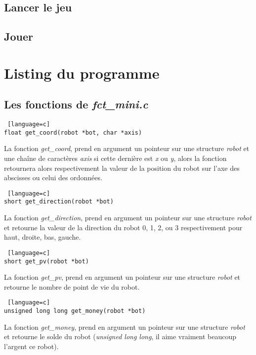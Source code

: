 \documentclass[a4paper, 11pt]{article}
\begin{document}
\subsection{Lancer le jeu}
\subsection{Jouer}

\newpage
\section{Listing du programme}
\subsection{Les fonctions de \emph{fct\_mini.c}}
\begin {lstlisting} [language=c]
float get_coord(robot *bot, char *axis)
\end{lstlisting}
La fonction \emph{get\_coord}, prend en argument un pointeur sur une structure \emph{robot} et une chaîne de caractères \emph{axis} si cette dernière est \emph{x} ou \emph{y}, alors la fonction retournera alors respectivement la valeur de la position du robot sur l'axe des abscisses ou celui des ordonnées.\\

\begin {lstlisting} [language=c]
short get_direction(robot *bot)
\end{lstlisting}
La fonction \emph{get\_direction}, prend en argument un pointeur sur une structure \emph{robot} et retourne la valeur de la direction du robot 0, 1, 2, ou 3 respectivement pour haut, droite, bas, gauche.\\

\begin {lstlisting} [language=c]
short get_pv(robot *bot)
\end{lstlisting}
La fonction \emph{get\_pv}, prend en argument un pointeur sur une structure \emph{robot} et retourne le nombre de point de vie du robot.\\

\begin {lstlisting} [language=c]
unsigned long long get_money(robot *bot)
\end{lstlisting}
La fonction \emph{get\_money}, prend en argument un pointeur sur une structure \emph{robot} et retourne le solde du robot (\emph{unsigned long long}, il aime vraiment beaucoup l'argent ce robot).\\
\end{document}
